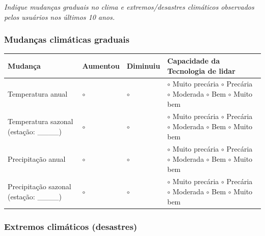 \emph{Indique mudanças graduais no clima e extremos/desastres climáticos observados pelos usuários nos últimos 10 anos.}

\subsubsection{Mudanças climáticas graduais}\label{mudanuxe7as-climuxe1ticas-graduais}

{
\begin{longtable}[]{@{}
  >{\raggedright\arraybackslash}p{}
  >{\centering\arraybackslash}p{}
  >{\centering\arraybackslash}p{}
  >{\centering\arraybackslash}p{}@{}}
\toprule\noalign{}
\begin{minipage}[b]{\linewidth}\raggedright
Mudança
\end{minipage} & \begin{minipage}[b]{\linewidth}\centering
Aumentou
\end{minipage} & \begin{minipage}[b]{\linewidth}\centering
Diminuiu
\end{minipage} & \begin{minipage}[b]{\linewidth}\centering
Capacidade da Tecnologia de lidar
\end{minipage} \\
\midrule\noalign{}
\endhead
\bottomrule\noalign{}
\endlastfoot
Temperatura anual & $\circ$ & $\circ$ & $\circ$ Muito precária $\circ$ Precária $\circ$ Moderada $\circ$ Bem $\circ$ Muito bem \\
Temperatura sazonal (estação: \_\_\_\_) & $\circ$ & $\circ$ & $\circ$ Muito precária $\circ$ Precária $\circ$ Moderada $\circ$ Bem $\circ$ Muito bem \\
Precipitação anual & $\circ$ & $\circ$ & $\circ$ Muito precária $\circ$ Precária $\circ$ Moderada $\circ$ Bem $\circ$ Muito bem \\
Precipitação sazonal (estação: \_\_\_\_) & $\circ$ & $\circ$ & $\circ$ Muito precária $\circ$ Precária $\circ$ Moderada $\circ$ Bem $\circ$ Muito bem \\
\end{longtable}
}

\subsubsection{Extremos climáticos (desastres)}\label{extremos-climuxe1ticos-desastres}

